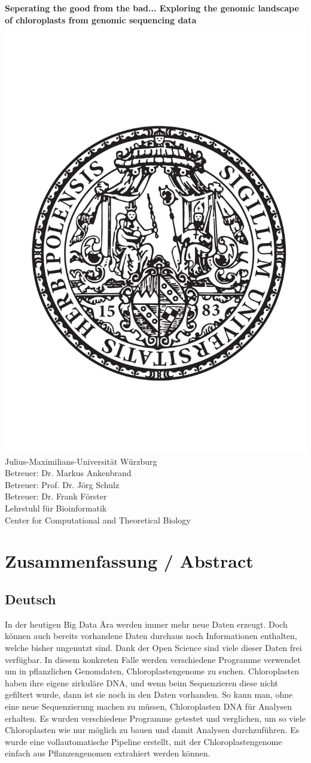 \documentclass{scrartcl}
\begin{document}
\begin{center}
\textbf{Seperating the good from the bad... Exploring the genomic landscape of chloroplasts from genomic sequencing data}
\includegraphics[width=.5\linewidth]{./neuSIEGEL.pdf}\\[1cm]
{\large Julius-Maximilians-Universität Würzburg}\\
{\large Betreuer: Dr. Markus Ankenbrand}\\
{\large Betreuer: Prof. Dr. Jörg Schulz}\\
{\large Betreuer: Dr. Frank Förster}\\
{\large Lehrstuhl für Bioinformatik}\\
{\large Center for Computational and Theoretical Biology}
\setcounter{page}{1}
\clearpage
\end{center}
\tableofcontents
\clearpage
\section{Zusammenfassung / Abstract}
\label{sec-1}
\subsection{Deutsch}
\label{sec-1-1}
In der heutigen Big Data Ära werden immer mehr neue Daten erzeugt. Doch können auch bereits vorhandene Daten durchaus noch Informationen enthalten, welche bisher ungenutzt sind. 
Dank der Open Science sind viele dieser Daten frei verfügbar. In diesem konkreten Falle werden verschiedene Programme verwendet um in pflanzlichen Genomdaten, Chloroplastengenome zu suchen.
Chloroplasten haben ihre eigene zirkuläre DNA, und wenn beim Sequenzieren diese nicht gefiltert wurde, dann ist sie noch in den Daten vorhanden. So kann man, ohne eine neue Sequenzierung machen zu müssen,
Chloroplasten DNA für Analysen erhalten. Es wurden verschiedene Programme getestet und verglichen, um so viele Chloroplasten wie nur möglich zu bauen und damit Analysen durchzuführen. Es wurde eine vollautomatische
Pipeline erstellt, mit der Chloroplastengenome einfach aus Pflanzengenomen extrahiert werden können.
\end{document}
